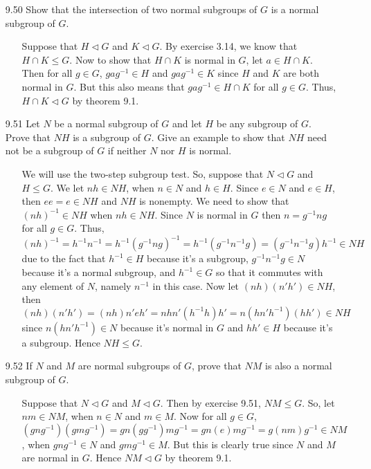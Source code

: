 \documentclass[12pt]{article}
\begin{document}
\begin{enumerate}
\item[9.50] Show that the intersection of two normal subgroups of $G$ is a normal subgroup of
$G$.
\begin{enumerate}
\item[] Suppose that $H \lhd G$ and $K \lhd G$. By exercise 3.14, we know that $H \cap K \leq G$.
Now to show that $H \cap K$ is normal in $G$, let $a \in H \cap K$. Then for all $g \in G$, 
$gag^{-1} \in H$ and $gag^{-1} \in K$ since $H$ and $K$ are both normal in $G$. But this also
means that $gag^{-1} \in H \cap K$ for all $g \in G$. Thus, $H \cap K \lhd G$ by theorem 9.1.
\end{enumerate}

\item[9.51] Let $N$ be a normal subgroup of $G$ and let $H$ be any subgroup of $G$. Prove
that $NH$ is a subgroup of $G$. Give an example to show that $NH$ need not be a subgroup
of $G$ if neither $N$ nor $H$ is normal.
\begin{enumerate}
\item[] We will use the two-step subgroup test. So, suppose that $N \lhd G$ and $H \leq G$. We let
$nh \in NH$, when $n \in N$ and $h \in H$. Since $e \in N$ and $e \in H$, then $ee = e \in NH$ and
$NH$ is nonempty. We need to show that $(nh)^{-1} \in NH$ when $nh \in NH$. Since $N$ is normal in
$G$ then $n = g^{-1}ng$ for all $g \in G$. Thus, $(nh)^{-1} = h^{-1}n^{-1} = h^{-1}(g^{-1}ng)^{-1} =
h^{-1}(g^{-1}n^{-1}g) = (g^{-1}n^{-1}g)h^{-1} \in NH$ due to the fact that $h^{-1} \in H$ because it's a subgroup, 
$g^{-1}n^{-1}g \in N$ because it's a normal subgroup, and $h^{-1} \in G$ so that it commutes with any element
of $N$, namely $n^{-1}$ in this case. Now let $(nh)(n'h') \in NH$, then $(nh)(n'h') = 
(nh)n'eh' = nhn'(h^{-1}h)h' = n(hn'h^{-1})(hh') \in NH$ since $n(hn'h^{-1}) \in N$ because it's 
normal in $G$ and $hh' \in H$ because it's a subgroup. Hence $NH \leq G$.
\end{enumerate}

\item[9.52] If $N$ and $M$ are normal subgroups of $G$, prove that $NM$ is also a normal 
subgroup of $G$.
\begin{enumerate}
\item[] Suppose that $N \lhd G$ and $M \lhd G$. Then by exercise 9.51, $NM \leq G$. So, let
$nm \in NM$, when $n \in N$ and $m \in M$. Now for all $g \in G$, \\
$(gng^{-1})(gmg^{-1}) = gn(gg^{-1})mg^{-1} = gn(e)mg^{-1} = g(nm)g^{-1} \in NM$, when
$gng^{-1} \in N$ and $gmg^{-1} \in M$. But this is clearly true since $N$ and $M$ are 
normal in $G$. Hence $NM \lhd G$ by theorem 9.1.
\end{enumerate}


\end{enumerate}
\end{document}
